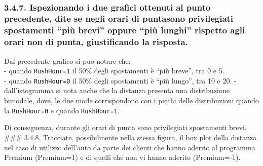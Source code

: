 \documentclass[11pt]{article}
\begin{document}
    \begin{center}
    \end{center}
    { \hspace*{\fill} \\}
    
    \hypertarget{ispezionando-i-due-grafici-ottenuti-al-punto-precedente-dite-se-negli-orari-di-puntasono-privilegiati-spostamenti-piuxf9-brevi-oppure-piuxf9-lunghi-rispetto-agli-orari-non-di-punta-giustificando-la-risposta.}{%
\subsubsection{3.4.7. Ispezionando i due grafici ottenuti al punto
precedente, dite se negli orari di puntasono privilegiati spostamenti
``più brevi'' oppure ``più lunghi'' rispetto agli orari non di punta,
giustificando la
risposta.}\label{ispezionando-i-due-grafici-ottenuti-al-punto-precedente-dite-se-negli-orari-di-puntasono-privilegiati-spostamenti-piuxf9-brevi-oppure-piuxf9-lunghi-rispetto-agli-orari-non-di-punta-giustificando-la-risposta.}}

Dal precedente grafico si può notare che:\\
- quando \texttt{RushHour=1} il 50\% degli spostamenti è ``più breve'',
tra 0 e 5.\\
- quando \texttt{RushHour=0} il 50\% degli spostamenti è ``più lungo'',
tra 10 e 20. - dall'istogramma si nota anche che la distanza presenta
una distribuzione bimodale, dove, le due mode corrispondono con i picchi
delle distribuzioni quando la \texttt{RushHour=0} e quando
\texttt{RushHour=1}.

Di conseguenza, durante gli orari di punta sono privilegiati spostamenti
brevi. \#\#\# 3.4.8. Tracciate, possibilmente nella stessa figura, il
box plot della distanza nel caso di utilizzo dell'auto da parte dei
clienti che hanno aderito al programma Premium (Premium=1) e di quelli
che non vi hanno aderito (Premium=-1).
\end{document}
